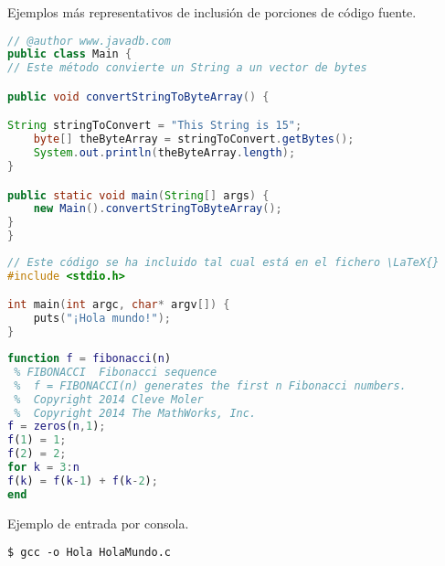 Ejemplos más representativos de inclusión de porciones de código 
fuente.

\begin{lstlisting}[language=Java,float=ht,caption={[Código fuente en Java]Ejemplo de código fuente en lenguaje Java},label=lst:java]
// @author www.javadb.com
public class Main {    
// Este método convierte un String a un vector de bytes

public void convertStringToByteArray() {

String stringToConvert = "This String is 15";      
	byte[] theByteArray = stringToConvert.getBytes();        
	System.out.println(theByteArray.length);        
}

public static void main(String[] args) {
	new Main().convertStringToByteArray();
}
}
\end{lstlisting}


\begin{lstlisting}[style=ruled,language=C,float=ht,caption={Ejemplo de código C},label=lst:codC]
// Este código se ha incluido tal cual está en el fichero \LaTeX{}
#include <stdio.h>

int main(int argc, char* argv[]) {
	puts("¡Hola mundo!");
}
\end{lstlisting}


\begin{lstlisting}[style=ruled,language=Matlab,float=ht,caption={Ejemplo escrito en Matlab},label=lst:matlab]
function f = fibonacci(n)
 % FIBONACCI  Fibonacci sequence
 %	f = FIBONACCI(n) generates the first n Fibonacci numbers.
 %	Copyright 2014 Cleve Moler
 %	Copyright 2014 The MathWorks, Inc.
f = zeros(n,1); 
f(1) = 1;
f(2) = 2;
for k = 3:n
f(k) = f(k-1) + f(k-2);
end
\end{lstlisting}

\noindent Ejemplo de entrada por consola.

\begin{lstlisting}[style=consola, numbers=none]
$ gcc -o Hola HolaMundo.c
\end{lstlisting}


